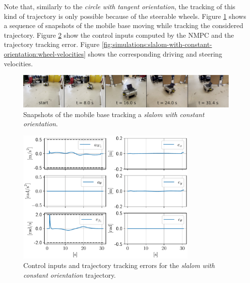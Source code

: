 Note that, similarly to the \textit{circle with tangent orientation}, the tracking of this kind of trajectory is only possible because of the steerable wheels.
Figure \ref{fig:experiments:slalom-with-constant-orientation:snapshots} shows a sequence of snapshots of the mobile base moving while tracking the considered trajectory. Figure \ref{fig:simulations:slalom-with-constant-orientation:inputs-and-errors} show the control inputs computed by the NMPC and the trajectory tracking error. Figure \ref{fig:simulations:slalom-with-constant-orientation:wheel-velocities} shows the corresponding driving and steering velocities.
\begin{figure}
    \centering
    \includegraphics[width=\textwidth]{figures/SWMR/simulations/slalom_with_constant_orientation/snapshots.jpeg}
    \caption{Snapshots of the mobile base tracking a \textit{slalom with constant orientation}.}
    \label{fig:experiments:slalom-with-constant-orientation:snapshots}
\end{figure}
\begin{figure}
    \centering
    \includegraphics[width=0.8\textwidth]{figures/SWMR/simulations/slalom_with_constant_orientation/inputs_and_errors.pdf}
    \caption{Control inputs and trajectory tracking errors for the \textit{slalom with constant orientation} trajectory.}
    \label{fig:simulations:slalom-with-constant-orientation:inputs-and-errors}
\end{figure}
